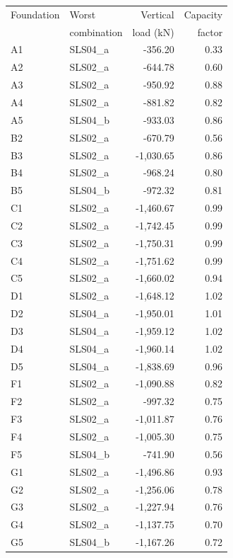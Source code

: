 \begin{center}
  \begin{tabular}{|l|l|r|r|}
\hline
Foundation & Worst & Vertical & Capacity\\
 & combination & load (kN) & factor\\
\hline
 A1 &  SLS04\_a & -356.20 & 0.33\\
 A2 &  SLS02\_a & -644.78 & 0.60\\
 A3 &  SLS02\_a & -950.92 & 0.88\\
 A4 &  SLS02\_a & -881.82 & 0.82\\
 A5 &  SLS04\_b & -933.03 & 0.86\\
 B2 &  SLS02\_a & -670.79 & 0.56\\
 B3 &  SLS02\_a & -1,030.65 & 0.86\\
 B4 &  SLS02\_a & -968.24 & 0.80\\
 B5 &  SLS04\_b & -972.32 & 0.81\\
 C1 &  SLS02\_a & -1,460.67 & 0.99\\
 C2 &  SLS02\_a & -1,742.45 & 0.99\\
 C3 &  SLS02\_a & -1,750.31 & 0.99\\
 C4 &  SLS02\_a & -1,751.62 & 0.99\\
 C5 &  SLS02\_a & -1,660.02 & 0.94\\
 D1 &  SLS02\_a & -1,648.12 & 1.02\\
 D2 &  SLS04\_a & -1,950.01 & 1.01\\
 D3 &  SLS04\_a & -1,959.12 & 1.02\\
 D4 &  SLS04\_a & -1,960.14 & 1.02\\
 D5 &  SLS04\_a & -1,838.69 & 0.96\\
 F1 &  SLS02\_a & -1,090.88 & 0.82\\
 F2 &  SLS02\_a & -997.32 & 0.75\\
 F3 &  SLS02\_a & -1,011.87 & 0.76\\
 F4 &  SLS02\_a & -1,005.30 & 0.75\\
 F5 &  SLS04\_b & -741.90 & 0.56\\
 G1 &  SLS02\_a & -1,496.86 & 0.93\\
 G2 &  SLS02\_a & -1,256.06 & 0.78\\
 G3 &  SLS02\_a & -1,227.94 & 0.76\\
 G4 &  SLS02\_a & -1,137.75 & 0.70\\
 G5 &  SLS04\_b & -1,167.26 & 0.72\\
\hline
  \end{tabular}
  \end{center}

